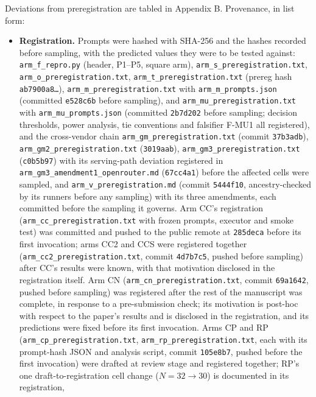 Deviations from preregistration are tabled in Appendix B. Provenance, in list form:

\begin{itemize}
\item \textbf{Registration.} Prompts were hashed with SHA-256 and the hashes recorded before sampling,
  with the predicted values they were to be tested against: \texttt{arm\_f\_repro.py} (header, P1--P5,
  square arm), \texttt{arm\_s\_preregistration.txt}, \texttt{arm\_o\_preregistration.txt},
  \texttt{arm\_t\_preregistration.txt} (prereg hash \texttt{ab7900a8\ldots}), \texttt{arm\_m\_preregistration.txt} with
  \texttt{arm\_m\_prompts.json} (committed \texttt{e528c6b} before sampling), and
  \texttt{arm\_mu\_preregistration.txt} with \texttt{arm\_mu\_prompts.json} (committed \texttt{2b7d202} before
  sampling; decision thresholds, power analysis, tie conventions and falsifier F-MU1 all
  registered), and the cross-vendor chain \texttt{arm\_gm\_preregistration.txt} (commit \texttt{37b3adb}),
  \texttt{arm\_gm2\_preregistration.txt} (\texttt{3019aab}), \texttt{arm\_gm3\_preregistration.txt} (\texttt{c0b5b97}) with
  its serving-path deviation registered in \texttt{arm\_gm3\_amendment1\_openrouter.md} (\texttt{67cc4a1})
  before the affected cells were sampled, and \texttt{arm\_v\_preregistration.md} (commit \texttt{5444f10},
  ancestry-checked by its runners before any sampling) with its three amendments, each
  committed before the sampling it governs. Arm CC's registration
  (\texttt{arm\_cc\_preregistration.txt} with frozen prompts, executor and smoke test) was
  committed and pushed to the public remote at \texttt{285deca} before its first invocation;
  arms CC2 and CCS were registered together (\texttt{arm\_cc2\_preregistration.txt}, commit
  \texttt{4d7b7c5}, pushed before sampling) after CC's results were known, with that
  motivation disclosed in the registration itself. Arm CN (\texttt{arm\_cn\_preregistration.txt},
  commit \texttt{69a1642}, pushed before sampling) was registered after the rest of the manuscript was
  complete, in response to a pre-submission check; its motivation is post-hoc with respect to the paper's results and is
  disclosed in the registration, and its predictions were fixed before its first invocation.
  Arms CP and RP (\texttt{arm\_cp\_preregistration.txt}, \texttt{arm\_rp\_preregistration.txt},
  each with its prompt-hash JSON and analysis script, commit \texttt{105e8b7}, pushed before
  the first invocation) were drafted at review stage and registered together; RP's one
  draft-to-registration cell change ($N = 32 \rightarrow 30$) is documented in its registration,

\end{itemize}
